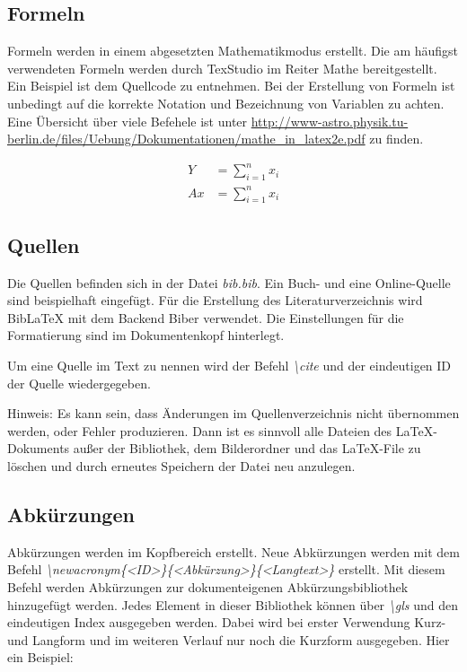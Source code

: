 \documentclass[12pt,a4paper, listof=entryprefix, bibliography=totocnumbered,toc=listofnumbered,lof=listofnumbered]{scrartcl}
\newcounter{verzeichnis}
\begin{document}
\subsection{Formeln}
\label{ch:Formeln}
Formeln werden in einem abgesetzten Mathematikmodus erstellt. Die am häufigst verwendeten Formeln werden durch TexStudio im Reiter Mathe bereitgestellt. Ein Beispiel ist dem Quellcode zu entnehmen. Bei der Erstellung von Formeln ist unbedingt auf die korrekte Notation und Bezeichnung von Variablen zu achten. Eine Übersicht über viele Befehele ist unter \url{http://www-astro.physik.tu-berlin.de/files/Uebung/Dokumentationen/mathe_in_latex2e.pdf} zu finden.

\begin{fleqn}[1.25cm]
\begin{align*}
	Y &= \sum_{i=1}^{n} x_{i} \\
	Ax &= \sum_{i=1}^{n} x_{i}
\end{align*}
\end{fleqn}

\subsection{Quellen}
\label{ch:quellen}
Die Quellen befinden sich in der Datei \textit{bib.bib}. Ein Buch- und eine Online-Quelle sind beispielhaft eingefügt. Für die Erstellung des Literaturverzeichnis wird BibLaTeX mit dem Backend Biber verwendet. Die Einstellungen für die Formatierung sind im Dokumentenkopf hinterlegt.

Um eine Quelle im Text zu nennen wird der Befehl \textit{\textbackslash cite} und der eindeutigen ID der Quelle wiedergegeben. \cite{Herrmann.2009}

Hinweis: Es kann sein, dass Änderungen im Quellenverzeichnis nicht übernommen werden, oder Fehler produzieren. Dann ist es sinnvoll alle Dateien des \LaTeX-Dokuments außer der Bibliothek, dem Bilderordner und das \LaTeX-File zu löschen und durch erneutes Speichern der Datei neu anzulegen.

\subsection{Abkürzungen}
\label{ch:abkuerzung}
Abkürzungen werden im  Kopfbereich erstellt. Neue Abkürzungen werden mit dem Befehl
\textit{\textbackslash newacronym\{\textless ID\textgreater\}\{\textless Abkürzung\textgreater\}\{\textless Langtext\textgreater\}} erstellt. Mit diesem Befehl werden Abkürzungen zur dokumenteigenen Abkürzungsbibliothek hinzugefügt werden. Jedes Element in dieser Bibliothek können über \textit{\textbackslash gls} und den eindeutigen Index ausgegeben werden. Dabei wird bei erster Verwendung Kurz- und Langform und im weiteren Verlauf nur noch die Kurzform ausgegeben. Hier ein Beispiel:
\end{document}
